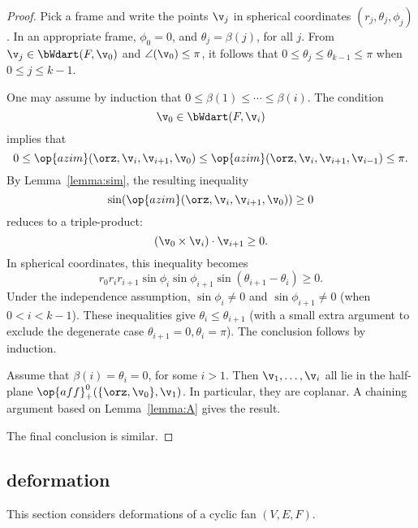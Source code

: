 \begin{proof}  
Pick a frame and write the points $\v_j$ in spherical coordinates
$(r_j,\theta_j,\phi_j)$.  In an appropriate frame, $\phi_0=0$, and
$\theta_j=\beta(j)$, for all $j$.  From $\v_j\in \bWdart(F,\v_0)$
and $\angle(\v_0)\le\pi$, it follows that
$0\le\theta_j\le\theta_{k-1}\le\pi$ when $0\le j\le k-1$.

One may assume by induction that $0\le \beta(1)\le\cdots\le
\beta(i)$.  The condition
\begin{displaymath}
\v_0\in \bWdart(F,\v_i)
\end{displaymath}
implies that
\begin{displaymath}
  0 \le \op{azim}(\orz,\v_i,\v_{i+1},\v_0)
\le \op{azim}(\orz,\v_i,\v_{i+1},\v_{i-1})\le\pi.
\end{displaymath}
By Lemma~\ref{lemma:sim}, the resulting inequality
\begin{displaymath}
\sin(\op{azim}(\orz,\v_i,\v_{i+1},\v_0))\ge 0
\end{displaymath}
reduces to a triple-product:
\begin{displaymath}
(\v_0 \times \v_i)\cdot \v_{i+1}\ge 0.
\end{displaymath}
In spherical coordinates, this inequality becomes
\begin{displaymath}
r_0r_ir_{i+1}\sin\phi_i\sin\phi_{i+1}\sin(\theta_{i+1}-\theta_i)\ge0.
\end{displaymath}
Under the independence assumption, $\sin\phi_i\ne0$ and
$\sin\phi_{i+1}\ne0$ (when $0< i < k-1$).  These inequalities give
$\theta_i\le\theta_{i+1}$ (with a small extra argument to exclude the
degenerate case $\theta_{i+1}=0,\theta_i=\pi$).  The conclusion
follows by induction.

Assume that $\beta(i)=\theta_i=0$, for some $i>1$.  Then
$\v_1,\ldots,\v_i$ all lie in the half-plane
$\op{aff}^0_+(\{\orz,\v_0\},\v_1)$.  In particular, they are coplanar.
A chaining argument based on Lemma~\ref{lemma:A} gives the result.

The final conclusion is similar.
\end{proof}



\subsection{deformation}\label{sec:deformation}

This section considers deformations of a cyclic fan $(V,E,F)$.

